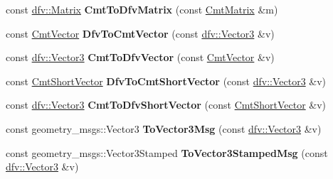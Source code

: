 \begin{DoxyCompactItemize}
\item 
\hypertarget{namespacexsens_a6eff5d01dc58d7e559ba372f243c980c}{const \hyperlink{classdfv_1_1Matrix}{dfv\-::\-Matrix} {\bfseries \-Cmt\-To\-Dfv\-Matrix} (const \hyperlink{structCmtMatrix}{\-Cmt\-Matrix} \&m)}\label{namespacexsens_a6eff5d01dc58d7e559ba372f243c980c}

\item 
\hypertarget{namespacexsens_a2eb81f616378d951ebc7cf9cff78e68a}{const \hyperlink{structCmtVector}{\-Cmt\-Vector} {\bfseries \-Dfv\-To\-Cmt\-Vector} (const \hyperlink{classdfv_1_1Vector3}{dfv\-::\-Vector3} \&v)}\label{namespacexsens_a2eb81f616378d951ebc7cf9cff78e68a}

\item 
\hypertarget{namespacexsens_a3c7eab15fd6b77388bc223946cdd65c1}{const \hyperlink{classdfv_1_1Vector3}{dfv\-::\-Vector3} {\bfseries \-Cmt\-To\-Dfv\-Vector} (const \hyperlink{structCmtVector}{\-Cmt\-Vector} \&v)}\label{namespacexsens_a3c7eab15fd6b77388bc223946cdd65c1}

\item 
\hypertarget{namespacexsens_ad297c28bf812ad5f51670155e22b7edd}{const \hyperlink{structCmtShortVector}{\-Cmt\-Short\-Vector} {\bfseries \-Dfv\-To\-Cmt\-Short\-Vector} (const \hyperlink{classdfv_1_1Vector3}{dfv\-::\-Vector3} \&v)}\label{namespacexsens_ad297c28bf812ad5f51670155e22b7edd}

\item 
\hypertarget{namespacexsens_a8768666496b1e425a9e3a460810fa01b}{const \hyperlink{classdfv_1_1Vector3}{dfv\-::\-Vector3} {\bfseries \-Cmt\-To\-Dfv\-Short\-Vector} (const \hyperlink{structCmtShortVector}{\-Cmt\-Short\-Vector} \&v)}\label{namespacexsens_a8768666496b1e425a9e3a460810fa01b}

\item 
\hypertarget{namespacexsens_abf90f370356f72dd7cbb8d61e6294927}{const geometry\-\_\-msgs\-::\-Vector3 {\bfseries \-To\-Vector3\-Msg} (const \hyperlink{classdfv_1_1Vector3}{dfv\-::\-Vector3} \&v)}\label{namespacexsens_abf90f370356f72dd7cbb8d61e6294927}

\item 
\hypertarget{namespacexsens_a13ca679e76b6f0d6091253bea3bc7114}{const geometry\-\_\-msgs\-::\-Vector3\-Stamped {\bfseries \-To\-Vector3\-Stamped\-Msg} (const \hyperlink{classdfv_1_1Vector3}{dfv\-::\-Vector3} \&v)}\label{namespacexsens_a13ca679e76b6f0d6091253bea3bc7114}


\end{DoxyCompactItemize}
